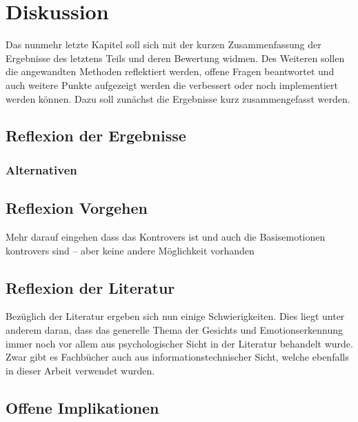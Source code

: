 \documentclass[12pt, a4paper]{scrbook}
\begin{document}
\let\cleardoublepage\relax





\chapter{Diskussion}


Das nunmehr letzte Kapitel soll sich mit der kurzen Zusammenfassung der Ergebnisse des letztens Teils und deren Bewertung widmen. 
Des Weiteren sollen die angewandten Methoden reflektiert werden,
offene Fragen beantwortet und auch weitere Punkte aufgezeigt werden die verbessert oder noch implementiert werden können. Dazu soll zunächst die Ergebnisse kurz zusammengefasst werden.


\section{Reflexion der Ergebnisse}

\subsection{Alternativen}


\section{Reflexion Vorgehen}

Mehr darauf eingehen dass das Kontrovers ist und auch die Basisemotionen kontrovers sind --  aber keine andere Möglichkeit vorhanden 



\section{Reflexion der Literatur}

Bezüglich der Literatur ergeben sich nun einige Schwierigkeiten. Dies liegt unter anderem daran, dass das generelle Thema der Gesichts und Emotionserkennung immer noch vor allem aus
psychologischer Sicht in der Literatur behandelt wurde. Zwar gibt es Fachbücher auch aus informationstechnischer Sicht, welche ebenfalls in dieser Arbeit verwendet wurden.



\section{Offene Implikationen}
\end{document}
